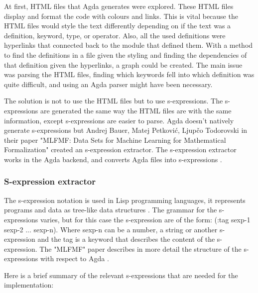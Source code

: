 At first, HTML files that Agda generates were explored. These HTML files
display and format the code with colours and links. This is vital because the
HTML files would style the text differently depending on if the text was a
definition, keyword, type, or operator. Also, all the used definitions were
hyperlinks that connected back to the module that defined them. With a method
to find the definitions in a file given the styling and finding the
dependencies of that definition given the hyperlinks, a graph could be created.
The main issue was parsing the HTML files, finding which keywords fell into
which definition was quite difficult, and using an Agda parser might have been
necessary.

The solution is not to use the HTML files but to use s-expressions. The
s-expressions are generated the same way the HTML files are with the same
information, except s-expressions are easier to parse. Agda doesn't natively
generate s-expressions but Andrej Bauer, Matej Petković, Ljupčo Todorovski in
their paper "MLFMF: Data Sets for Machine Learning for Mathematical
Formalization" \cite{bauer2023mlfmf} created an s-expression extractor. The
s-expression extractor works in the Agda backend, and converts Agda
files into s-expressions \cite{andrej}.

\subsubsection{S-expression extractor}


The s-expression notation is used in Lisp programming languages, it represents
programs and data as tree-like data structures \cite{sexp}. The grammar for the
s-expressions varies, but for this case the s-expression are of the form: (:tag
sexp-1 sexp-2 ... sexp-n). Where sexp-n can be a number, a string or another
s-expression and the tag is a keyword that describes the content of the
s-expression. The "MLFMF" paper describes in more detail the structure of the
s-expressions with respect to Agda \cite{bauer2023mlfmf}.

Here is a brief summary of the relevant s-expressions that are needed for the implementation:


